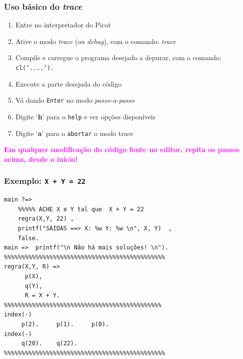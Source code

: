 \begin{frame}[fragile]

\frametitle{Uso básico do \textit{trace}}

\begin{enumerate}
  \item Entre no interpretador do Picat
  
    \item Ative o modo \textit{trace} (ou \textit{debug}), com o comando: \textit{trace}
    
    \item Compile e carregue o programa desejado 
    a depurar, com o comando: \texttt{cl(`....').}
    
    \item Execute a parte desejada do código
    
    \item Vá dando \texttt{Enter} no modo \textit{passo-a-passo}
    
    \item Digite `\textbf{h}' para o \texttt{help}\texttt{\texttt{}}  e ver opções disponíveis
    
    \item Digite `\textbf{a}' para o \texttt{abortar}\texttt{} o modo trace
      
\end{enumerate}
\begin{center}
\textbf{\textcolor{magenta}{Em qualquer modificação do código fonte no editor, repita os passos acima, desde o início!}}
\end{center}

\end{frame}

\begin{frame}[fragile]

\frametitle{Exemplo:  \texttt{X + Y = 22}}

\begin{footnotesize}
\begin{verbatim}
main ?=> 
    %%%%% ACHE X e Y tal que  X + Y = 22 
    regra(X,Y, 22) , 
    printf("SAIDAS ==> X: %w Y: %w \n", X, Y)  ,  
    false.
main =>  printf("\n Não há mais soluções! \n"). 
%%%%%%%%%%%%%%%%%%%%%%%%%%%%%%%%%%%%%%%%%%%%%% 
regra(X,Y, R) =>   
      p(X),
      q(Y),
      R = X + Y.
%%%%%%%%%%%%%%%%%%%%%%%%%%%%%%%%%%%%%%%%%%%%%
index(-)      
     p(2).     p(1).     p(0).
index(-)      
     q(20).    q(22).
%%%%%%%%%%%%%%%%%%%%%%%%%%%%%%%%%%%%%%%%%%%%%%   
\end{verbatim}
\end{footnotesize}
\end{frame}

